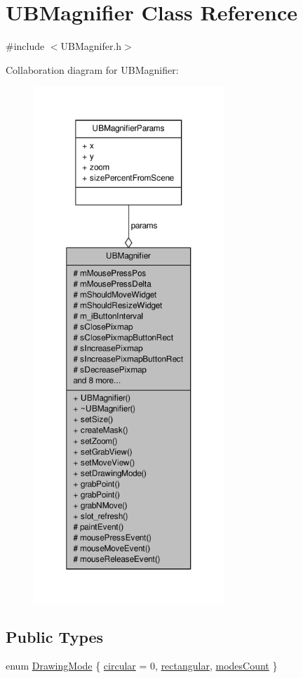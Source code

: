 \hypertarget{class_u_b_magnifier}{\section{U\-B\-Magnifier Class Reference}
\label{d4/d9d/class_u_b_magnifier}
}


{\ttfamily \#include $<$U\-B\-Magnifer.\-h$>$}



Collaboration diagram for U\-B\-Magnifier\-:
\nopagebreak
\begin{figure}[H]
\begin{center}
\leavevmode
\includegraphics[height=550pt]{dd/d0d/class_u_b_magnifier__coll__graph}
\end{center}
\end{figure}
\subsection*{Public Types}
\begin{DoxyCompactItemize}
\item 
enum \hyperlink{class_u_b_magnifier_a6c6c18c690a2b5951c96834210a48d91}{Drawing\-Mode} \{ \hyperlink{class_u_b_magnifier_a6c6c18c690a2b5951c96834210a48d91a6a8030c25128ae93617471dc82f09230}{circular} =  0, 
\hyperlink{class_u_b_magnifier_a6c6c18c690a2b5951c96834210a48d91a463b5e7a719ea427222b6ffa53b38415}{rectangular}, 
\hyperlink{class_u_b_magnifier_a6c6c18c690a2b5951c96834210a48d91aef4e5ffbaf32c3799473864e0e4235cc}{modes\-Count}
 \}
\end{DoxyCompactItemize}
